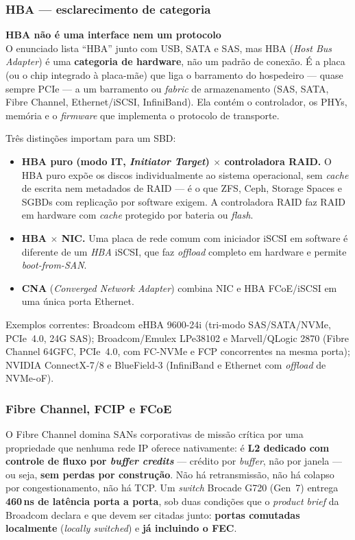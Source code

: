 \documentclass[11pt,a4paper]{article}
\newcommand{\correcao}[2]{%
  \begin{center}\begin{minipage}{0.96\textwidth}
  \colorbox{fundo}{\begin{minipage}{\dimexpr\linewidth-2\fboxsep}
  \vspace{3pt}\textbf{\color{laranja}#1}\\[2pt]\small #2\vspace{4pt}
  \end{minipage}}\end{minipage}\end{center}}
\begin{document}
\subsubsection{HBA --- esclarecimento de categoria}

\correcao{HBA não é uma interface nem um protocolo}{%
O enunciado lista ``HBA'' junto com USB, SATA e SAS, mas HBA (\emph{Host Bus Adapter}) é
uma \textbf{categoria de hardware}, não um padrão de conexão. É a placa (ou o chip
integrado à placa-mãe) que liga o barramento do hospedeiro --- quase sempre PCIe --- a um
barramento ou \emph{fabric} de armazenamento (SAS, SATA, Fibre Channel, Ethernet/iSCSI,
InfiniBand). Ela contém o controlador, os PHYs, memória e o \emph{firmware} que implementa
o protocolo de transporte.}

Três distinções importam para um SBD:

\begin{itemize}
\item \textbf{HBA puro (modo IT, \emph{Initiator Target}) $\times$ controladora RAID.} O HBA
      puro expõe os discos individualmente ao sistema operacional, sem \emph{cache} de
      escrita nem metadados de RAID --- é o que ZFS, Ceph, Storage Spaces e SGBDs com
      replicação por software exigem. A controladora RAID faz RAID em hardware com
      \emph{cache} protegido por bateria ou \emph{flash}.
\item \textbf{HBA $\times$ NIC.} Uma placa de rede comum com iniciador iSCSI em software é
      diferente de um \emph{HBA} iSCSI, que faz \emph{offload} completo em hardware e
      permite \emph{boot-from-SAN}.
\item \textbf{CNA} (\emph{Converged Network Adapter}) combina NIC e HBA FCoE/iSCSI em uma
      única porta Ethernet.
\end{itemize}

Exemplos correntes: Broadcom eHBA 9600-24i (tri-modo SAS/SATA/NVMe, PCIe~4.0, 24G SAS);
Broadcom/Emulex LPe38102 e Marvell/QLogic 2870 (Fibre Channel 64GFC, PCIe~4.0, com FC-NVMe
e FCP concorrentes na mesma porta); NVIDIA ConnectX-7/8 e BlueField-3 (InfiniBand e Ethernet
com \emph{offload} de NVMe-oF).

\subsubsection{Fibre Channel, FCIP e FCoE}

O Fibre Channel domina SANs corporativas de missão crítica por uma propriedade que nenhuma
rede IP oferece nativamente: é \textbf{L2 dedicado com controle de fluxo por \emph{buffer
credits}} --- crédito por \emph{buffer}, não por janela --- ou seja, \textbf{sem perdas por
construção}. Não há retransmissão, não há colapso por congestionamento, não há TCP. Um
\emph{switch} Brocade G720 (Gen~7) entrega \textbf{460\,ns de latência porta a porta}, sob
duas condições que o \emph{product brief} da Broadcom declara e que devem ser citadas
junto: \textbf{portas comutadas localmente} (\emph{locally switched}) e \textbf{já incluindo
o FEC}.
\end{document}
